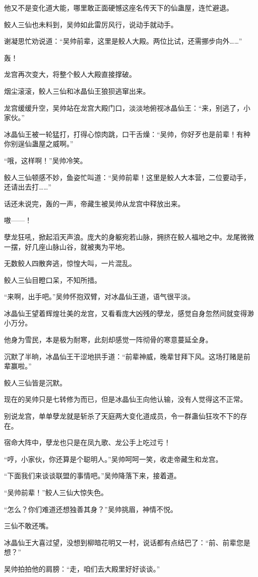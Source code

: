 \begin{this_body}
他又不是变化道大能，哪里敢正面硬憾这座名传天下的仙蛊屋，连忙避退。

鲛人三仙也未料到，吴帅如此雷厉风行，说动手就动手。

谢凝思忙劝说道：“吴帅前辈，这里是鲛人大殿。两位比试，还需挪步向外……”

轰！

龙宫再次变大，将整个鲛人大殿直接撑破。

烟尘滚滚，鲛人三仙和冰晶仙王狼狈逃窜出来。

龙宫缓缓升空，吴帅站在龙宫大殿门口，淡淡地俯视冰晶仙王：“来，别逃了，小家伙。”

冰晶仙王被一轮猛打，打得心惊肉跳，口干舌燥：“吴帅，你好歹也是前辈！有种你别逞仙蛊屋之威啊。”

“哦，这样啊！”吴帅冷笑。

鲛人三仙顿感不妙，鱼姿忙叫道：“吴帅前辈！这里是鲛人大本营，二位要动手，还请出去打……”

话还未说完，轰的一声，帝藏生被吴帅从龙宫中释放出来。

嗷——！

孽龙狂吼，掀起滔天声浪。庞大的身躯宛若山脉，拥挤在鲛人福地之中。龙尾微微一摆，好几座山脉山谷，就被夷为平地。

无数鲛人四散奔逃，惊惶大叫，一片混乱。

鲛人三仙目瞪口呆，不知所措。

“来啊，出手吧。”吴帅怀抱双臂，对冰晶仙王道，语气很平淡。

冰晶仙王望着辉煌壮美的龙宫，又看看庞大凶残的孽龙，感觉自身忽然间就变得渺小万分。

他身为雪民，本是极为耐寒，此刻却感觉一阵彻骨的寒意蔓延全身。

沉默了半晌，冰晶仙王干涩地拱手道：“前辈神威，晚辈甘拜下风。这场打赌是前辈赢啦。”

鲛人三仙皆是沉默。

现在的吴帅只是七转修为而已，但是冰晶仙王向他认输，没有人觉得这不正常。

别说龙宫，单单孽龙就是斩杀了天庭两大变化道成员，令一群蛊仙狂攻不下的存在。

宿命大阵中，孽龙也只是在凤九歌、龙公手上吃过亏！

“哼，小家伙，你还算是个聪明人。”吴帅呵呵一笑，收走帝藏生和龙宫。

“下面我们来谈谈联盟的事情吧。”吴帅降落下来，接着道。

“吴帅前辈！”鲛人三仙大惊失色。

“怎么？你们难道还想独善其身？”吴帅挑眉，神情不悦。

三仙不敢还嘴。

冰晶仙王大喜过望，没想到柳暗花明又一村，说话都有点结巴了：“前、前辈您是想？”

吴帅拍拍他的肩膀：“走，咱们去大殿里好好谈谈。”

\end{this_body}

